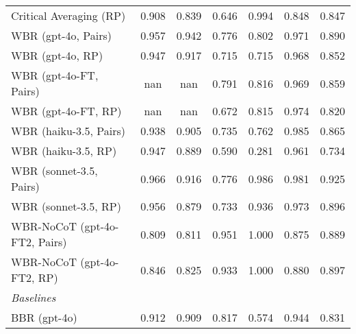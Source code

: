 \begin{table}[htbp]
\begin{tabular}{lcccccc}
Critical Averaging (RP) & \cellcolor{green!27}0.908 & \cellcolor{green!25}0.839 & \cellcolor{green!19}0.646 & \cellcolor{green!29}0.994 & \cellcolor{green!25}0.848 & \cellcolor{green!25}0.847 \\
WBR (gpt-4o, Pairs) & \cellcolor{green!28}0.957 & \cellcolor{green!28}0.942 & \cellcolor{green!23}0.776 & \cellcolor{green!24}0.802 & \cellcolor{green!29}0.971 & \cellcolor{green!26}0.890 \\
WBR (gpt-4o, RP) & \cellcolor{green!28}0.947 & \cellcolor{green!27}0.917 & \cellcolor{green!21}0.715 & \cellcolor{green!21}0.715 & \cellcolor{green!29}0.968 & \cellcolor{green!25}0.852 \\
WBR (gpt-4o-FT, Pairs) & nan & nan & \cellcolor{green!23}0.791 & \cellcolor{green!24}0.816 & \cellcolor{green!29}0.969 & \cellcolor{green!25}0.859 \\
WBR (gpt-4o-FT, RP) & nan & nan & \cellcolor{green!20}0.672 & \cellcolor{green!24}0.815 & \cellcolor{green!29}0.974 & \cellcolor{green!24}0.820 \\
WBR (haiku-3.5, Pairs) & \cellcolor{green!28}0.938 & \cellcolor{green!27}0.905 & \cellcolor{green!22}0.735 & \cellcolor{green!22}0.762 & \cellcolor{green!29}0.985 & \cellcolor{green!25}0.865 \\
WBR (haiku-3.5, RP) & \cellcolor{green!28}0.947 & \cellcolor{green!26}0.889 & \cellcolor{green!17}0.590 & \cellcolor{green!8}0.281 & \cellcolor{green!28}0.961 & \cellcolor{green!22}0.734 \\
WBR (sonnet-3.5, Pairs) & \cellcolor{green!28}0.966 & \cellcolor{green!27}0.916 & \cellcolor{green!23}0.776 & \cellcolor{green!29}0.986 & \cellcolor{green!29}0.981 & \cellcolor{green!27}0.925 \\
WBR (sonnet-3.5, RP) & \cellcolor{green!28}0.956 & \cellcolor{green!26}0.879 & \cellcolor{green!21}0.733 & \cellcolor{green!28}0.936 & \cellcolor{green!29}0.973 & \cellcolor{green!26}0.896 \\
WBR-NoCoT (gpt-4o-FT2, Pairs) & \cellcolor{green!24}0.809 & \cellcolor{green!24}0.811 & \cellcolor{green!28}0.951 & \cellcolor{green!30}1.000 & \cellcolor{green!26}0.875 & \cellcolor{green!26}0.889 \\
WBR-NoCoT (gpt-4o-FT2, RP) & \cellcolor{green!25}0.846 & \cellcolor{green!24}0.825 & \cellcolor{green!27}0.933 & \cellcolor{green!30}1.000 & \cellcolor{green!26}0.880 & \cellcolor{green!26}0.897 \\
\midrule
\textit{Baselines} \\
BBR (gpt-4o) & \cellcolor{green!27}0.912 & \cellcolor{green!27}0.909 & \cellcolor{green!24}0.817 & \cellcolor{green!17}0.574 & \cellcolor{green!28}0.944 & \cellcolor{green!24}0.831 \\

\end{tabular}
\end{table}
